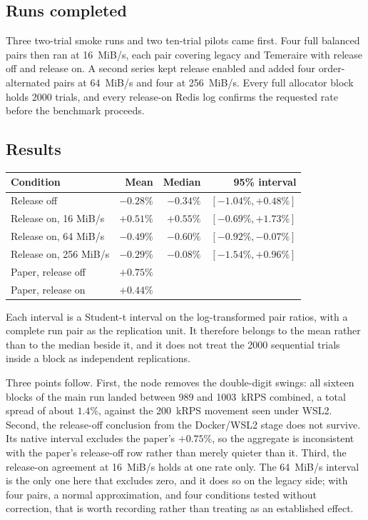 \documentclass[a4paper,11pt]{article}
\begin{document}
\subsection{Runs completed}

Three two-trial smoke runs and two ten-trial pilots came first. Four full
balanced pairs then ran at 16~MiB/s, each pair covering legacy and Temeraire
with release off and release on. A second series kept release enabled and added
four order-alternated pairs at 64~MiB/s and four at 256~MiB/s. Every full
allocator block holds 2000 trials, and every release-on Redis log confirms the
requested rate before the benchmark proceeds.

\subsection{Results}

\begin{center}
\begin{tabular}{@{}lrrr@{}}
\toprule
Condition & Mean & Median & 95\% interval \\
\midrule
Release off            & $-0.28\%$ & $-0.34\%$ & $[-1.04\%,+0.48\%]$ \\
Release on, 16 MiB/s   & $+0.51\%$ & $+0.55\%$ & $[-0.69\%,+1.73\%]$ \\
Release on, 64 MiB/s   & $-0.49\%$ & $-0.60\%$ & $[-0.92\%,-0.07\%]$ \\
Release on, 256 MiB/s  & $-0.29\%$ & $-0.08\%$ & $[-1.54\%,+0.96\%]$ \\
\midrule
Paper, release off     & $+0.75\%$ & & \\
Paper, release on      & $+0.44\%$ & & \\
\bottomrule
\end{tabular}
\end{center}

Each interval is a Student-t interval on the log-transformed pair ratios, with a
complete run pair as the replication unit. It therefore belongs to the mean
rather than to the median beside it, and it does not treat the 2000 sequential
trials inside a block as independent replications.

Three points follow. First, the node removes the double-digit swings: all
sixteen blocks of the main run landed between 989 and 1003~kRPS combined, a
total spread of about $1.4\%$, against the 200~kRPS movement seen under WSL2.
Second, the release-off conclusion from the Docker/WSL2 stage does not survive.
Its native interval excludes the paper's $+0.75\%$, so the aggregate is
inconsistent with the paper's release-off row rather than merely quieter than it.
Third, the release-on agreement at 16~MiB/s holds at one rate only. The
64~MiB/s interval is the only one here that excludes zero, and it does so on the
legacy side; with four pairs, a normal approximation, and four conditions tested
without correction, that is worth recording rather than treating as an
established effect.
\end{document}

